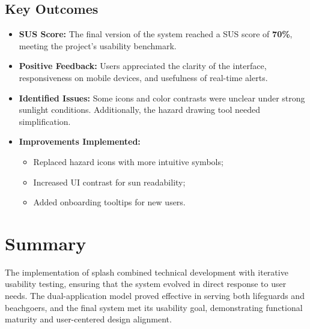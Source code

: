 \subsection{Key Outcomes}

\begin{itemize}
    \item \textbf{SUS Score:} The final version of the system reached a SUS score of \textbf{70\%}, meeting the project’s usability benchmark.
    
    \item \textbf{Positive Feedback:} Users appreciated the clarity of the interface, responsiveness on mobile devices, and usefulness of real-time alerts.
    
    \item \textbf{Identified Issues:} Some icons and color contrasts were unclear under strong sunlight conditions. Additionally, the hazard drawing tool needed simplification.

    \item \textbf{Improvements Implemented:} 
    \begin{itemize}
        \item Replaced hazard icons with more intuitive symbols;
        \item Increased UI contrast for sun readability;
        \item Added onboarding tooltips for new users.
    \end{itemize}
\end{itemize}

\section{Summary}

The implementation of \ac{splash} combined technical development with iterative usability testing, ensuring that the system evolved in direct response to user needs. The dual-application model proved effective in serving both lifeguards and beachgoers, and the final system met its usability goal, demonstrating functional maturity and user-centered design alignment.
